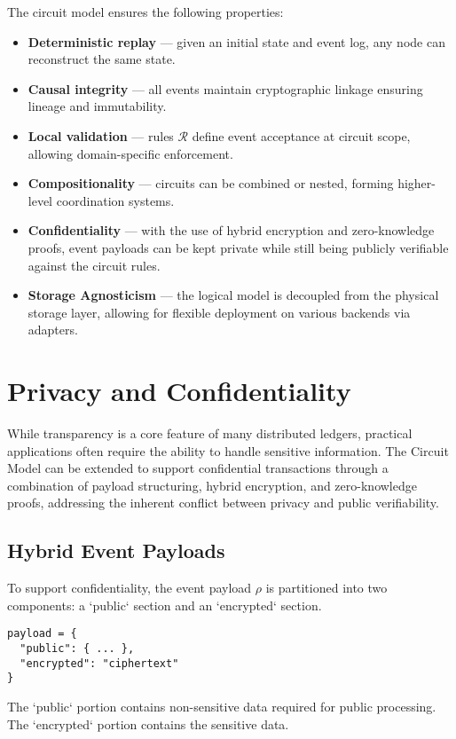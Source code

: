 \documentclass{article}
\begin{document}
The circuit model ensures the following properties:
\begin{itemize}
    \item \textbf{Deterministic replay} — given an initial state and event log, any node can reconstruct the same state.    \item \textbf{Causal integrity} — all events maintain cryptographic linkage ensuring lineage and immutability.    \item \textbf{Local validation} — rules $\mathcal{R}$ define event acceptance at circuit scope, allowing domain-specific enforcement.    \item \textbf{Compositionality} — circuits can be combined or nested, forming higher-level coordination systems.    \item \textbf{Confidentiality} — with the use of hybrid encryption and zero-knowledge proofs, event payloads can be kept private while still being publicly verifiable against the circuit rules.    \item \textbf{Storage Agnosticism} — the logical model is decoupled from the physical storage layer, allowing for flexible deployment on various backends via adapters.
\end{itemize}

\section{Privacy and Confidentiality}

While transparency is a core feature of many distributed ledgers, practical applications often require the ability to handle sensitive information. The Circuit Model can be extended to support confidential transactions through a combination of payload structuring, hybrid encryption, and zero-knowledge proofs, addressing the inherent conflict between privacy and public verifiability.

\subsection{Hybrid Event Payloads}
To support confidentiality, the event payload $\rho$ is partitioned into two components: a `public` section and an `encrypted` section.
\begin{verbatim}
payload = {
  "public": { ... },
  "encrypted": "ciphertext"
}
\end{verbatim}
The `public` portion contains non-sensitive data required for public processing. The `encrypted` portion contains the sensitive data.
\end{document}
